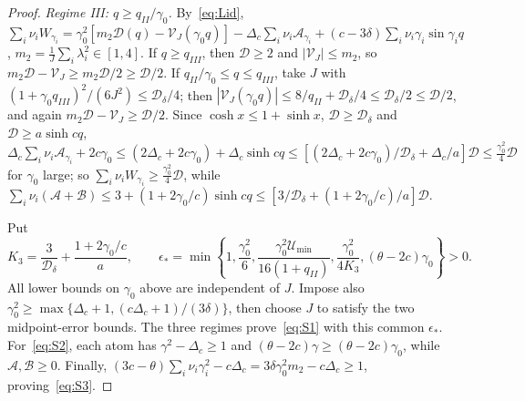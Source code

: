 \documentclass[11pt]{article}
\theoremstyle{definition}
\theoremstyle{remark}
\newcommand{\cA}{\mathcal A}
\newcommand{\cB}{\mathcal B}
\newcommand{\ch}{\cosh}
\newcommand{\sh}{\sinh}
\begin{document}
\begin{proof}
\emph{Regime III: \(q\ge q_{II}/\gamma_0\).}  By~\eqref{eq:Lid},
\(\sum_i\nu_iW_{\gamma_i}=\gamma_0^2[m_2\mathcal D(q)-\mathcal V_J(\gamma_0 q)]-\Delta_c\sum_i\nu_i\cA_{\gamma_i}+(c-3\delta)\sum_i\nu_i\gamma_i\sin\gamma_iq\),
\(m_2=\frac1J\sum_i\lambda_i^2\in[1,4]\).  If \(q\ge q_{III}\), then \(\mathcal D\ge2\) and \(|\mathcal V_J|\le m_2\),
so \(m_2\mathcal D-\mathcal V_J\ge m_2\mathcal D/2\ge \mathcal D/2\).  If \(q_{II}/\gamma_0\le q\le q_{III}\), take \(J\) with
\((1+\gamma_0 q_{III})^2/(6J^2)\le \mathcal D_\delta/4\); then
\(|\mathcal V_J(\gamma_0 q)|\le8/q_{II}+\mathcal D_\delta/4\le \mathcal D_\delta/2\le \mathcal D/2\), and again \(m_2\mathcal D-\mathcal V_J\ge \mathcal D/2\).
Since \(\ch x\le1+\sh x\), \(\mathcal D\ge \mathcal D_\delta\) and \(\mathcal D\ge a\sh cq\),
\(\Delta_c\sum_i\nu_i\cA_{\gamma_i}+2c\gamma_0\le(2\Delta_c+2c\gamma_0)+\Delta_c\sh cq
\le[(2\Delta_c+2c\gamma_0)/\mathcal D_\delta+\Delta_c/a]\mathcal D\le\frac{\gamma_0^2}4\mathcal D\) for \(\gamma_0\) large; so
\(\sum_i\nu_iW_{\gamma_i}\ge\frac{\gamma_0^2}4\mathcal D\), while
\(\sum_i\nu_i(\cA+\cB)\le3+(1+2\gamma_0/c)\sh cq\le[3/\mathcal D_\delta+(1+2\gamma_0/c)/a]\mathcal D\).

Put
\[
K_3=\frac3{\mathcal D_\delta}+\frac{1+2\gamma_0/c}{a},\qquad
\epsilon_*=
\min\left\{1,\frac{\gamma_0^2}6,
\frac{\gamma_0^2\mathcal U_{\min}}{16(1+q_{II})},
\frac{\gamma_0^2}{4K_3},(\theta-2c)\gamma_0\right\}>0.
\]
All lower bounds on \(\gamma_0\) above are independent of \(J\).
Impose also
\(\gamma_0^2\ge\max\{\Delta_c+1,(c\Delta_c+1)/(3\delta)\}\),
then choose \(J\) to satisfy the two midpoint-error bounds.
The three regimes prove~\eqref{eq:S1} with this common \(\epsilon_*\).
For~\eqref{eq:S2}, each atom has \(\gamma^2-\Delta_c\ge1\) and
\((\theta-2c)\gamma\ge(\theta-2c)\gamma_0\), while
\(\cA,\cB\ge0\).  Finally,
\((3c-\theta)\sum_i\nu_i\gamma_i^2-c\Delta_c
=3\delta\gamma_0^2m_2-c\Delta_c\ge1\), proving~\eqref{eq:S3}.
\end{proof}
\end{document}
